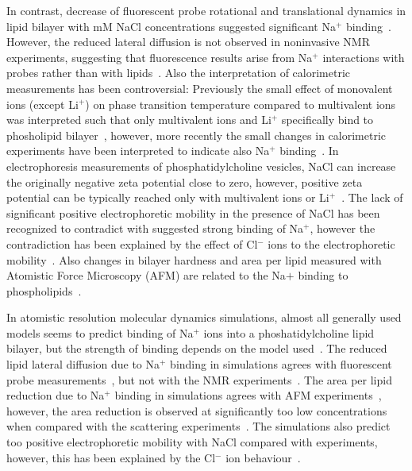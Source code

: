 \documentclass[pre,aps,floatfix,authordate1-4,twocolumn]{revtex4-1}
\begin{document}
In contrast, decrease of fluorescent probe rotational and translational dynamics in lipid bilayer with mM NaCl concentrations
suggested significant Na$^{+}$ binding~\cite{bockmann03,vacha09a,harb13}. However, the reduced lateral diffusion is not observed
in noninvasive NMR experiments, suggesting that fluorescence results arise from Na$^{+}$ interactions with probes rather than with 
lipids~\cite{filippov09}. Also the interpretation of calorimetric measurements has been controversial: Previously the small effect of
monovalent ions (except Li$^+$)  on phase transition temperature compared to multivalent ions was interpreted such that 
only multivalent ions and Li$^+$ specifically bind to phosholipid bilayer~\cite{cevc90}, however, more recently the
small changes in calorimetric experiments have been interpreted to indicate also Na$^+$ binding~\cite{bockmann03,klasczyk10}.
In electrophoresis measurements of phosphatidylcholine vesicles, NaCl can increase the originally negative zeta potential 
close to zero, however, positive zeta potential can be typically reached only with multivalent ions or Li$^+$~\cite{eisenberg79,tatulian87,manyes05,manyes06,klasczyk10}. 
The lack of significant positive electrophoretic mobility in the presence
of NaCl has been recognized to contradict with suggested strong binding of Na$^+$, however the contradiction
has been explained by the effect of Cl$^-$ ions to the electrophoretic mobility~\cite{berkowitz06,knecht13}.
Also changes in bilayer hardness and area per lipid measured with Atomistic Force Microscopy (AFM)
are related to the Na$ {+}$ binding to phospholipids~\cite{manyes05,manyes06,fukuma07,ferber11,morata12}.

In atomistic resolution molecular dynamics simulations, almost all generally used models seems
to predict binding of Na${^+}$ ions into a phoshatidylcholine lipid bilayer, 
but the strength of binding depends on the model used~\cite{bockmann03,bockmann04,sachs04,berkowitz06,cordomi09,valley11,berkowitz12}. 
The reduced lipid lateral diffusion due to Na$^+$ binding in simulations agrees with 
fluorescent probe measurements~\cite{bockmann03,vacha09a,harb13}, but not with the NMR experiments~\cite{filippov09}.
The area per lipid reduction due to Na$^+$ binding in simulations agrees with AFM 
experiments~\cite{manyes05,manyes06,fukuma07,ferber11,morata12}, however, the area reduction is 
observed at significantly too low concentrations when compared with the scattering experiments~\cite{pabst07}.
The simulations also predict too positive electrophoretic mobility with NaCl compared with experiments, 
however, this has been explained by the Cl$^-$ ion behaviour~\cite{berkowitz06,knecht13}.
\end{document}

